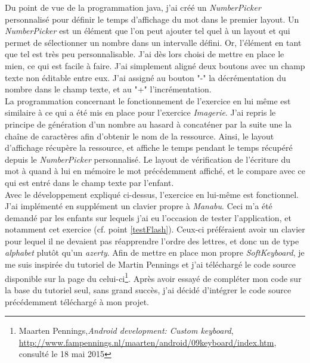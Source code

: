 Du point de vue de la programmation java, j'ai créé un \textit{NumberPicker} personnalisé pour définir le temps d'affichage du mot dans le premier layout. Un \textit{NumberPicker} est un élément que l'on peut ajouter tel quel à un layout et qui permet de sélectionner un nombre dans un intervalle défini. Or, l'élément en tant que tel est très peu personnalisable. J'ai dès lors choisi de mettre en place le mien, ce qui est facile à faire. J'ai simplement aligné deux boutons avec un champ texte non éditable entre eux. J'ai assigné au bouton "-" la décrémentation du nombre dans le champ texte, et au "+" l'incrémentation.\\

La programmation concernant le fonctionnement de l'exercice en lui même est similaire à ce qui a été mis en place pour l'exercice \textit{Imagerie}. J'ai repris le principe de génération d'un nombre au hasard à concaténer par la suite une la chaîne de caractères afin d'obtenir le nom de la ressource. Ainsi, le layout d'affichage récupère la ressource, et affiche le temps pendant le temps récupéré depuis le \textit{NumberPicker} personnalisé. Le layout de vérification de l'écriture du mot à quand à lui en mémoire le mot précédemment affiché, et le compare avec ce qui est entré dans le champ texte par l'enfant.\\


Avec le développement expliqué ci-dessus, l'exercice en lui-même est fonctionnel. J'ai implémenté en supplément un clavier propre à \textit{Manabu}\label{clavier}. Ceci m'a été demandé par les enfants sur lequels j'ai eu l'occasion de tester l'application, et notamment cet exercice (cf. point \ref{testFlash}). Ceux-ci préféraient avoir un clavier pour lequel il ne devaient pas réapprendre l'ordre des lettres, et donc un de type \textit{alphabet} plutôt qu'un \textit{azerty}. Afin de mettre en place mon propre \textit{SoftKeyboard}, je me suis inspirée du tutoriel de Martin Pennings et j'ai téléchargé le code source disponible sur la page du celui-ci\footnote{Maarten Pennings,\textit{Android development: Custom keyboard}, \url{http://www.fampennings.nl/maarten/android/09keyboard/index.htm}, consulté le 18 mai 2015}. Après avoir essayé de compléter mon code sur la base du tutoriel seul, sans grand succès, j'ai décidé d'intégrer le code source précédemment téléchargé à mon projet.\\

